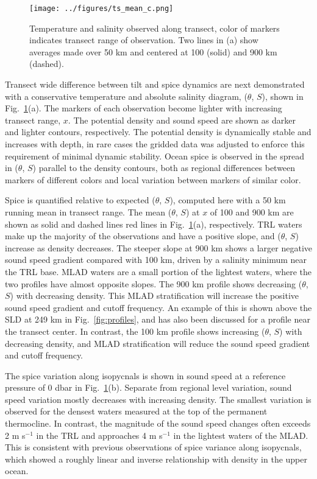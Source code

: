 \documentclass[preprint,NumberedRefs]{JASA}
\begin{document}
\begin{figure}
\texttt{[image: ../figures/ts\_mean\_c.png]}
    \caption{\label{fig:ts_diagram}{Temperature and salinity observed along transect, color of markers indicates transect range of observation. Two lines in (a) show averages made over 50 km and centered at 100 (solid) and 900 km (dashed).}}
\end{figure}
Transect wide difference between tilt and spice dynamics are next demonstrated with a conservative temperature and absolute salinity diagram\cite{TEOS10}, ($\theta$, $S$), shown in Fig.~\ref{fig:ts_diagram}(a). The markers of each observation become lighter with increasing transect range, $x$. The potential density and sound speed are shown as darker and lighter contours, respectively. The potential density is dynamically stable and increases with depth, in rare cases the gridded data was adjusted to enforce this requirement of minimal dynamic stability\citep{barker2017stabilizing}. Ocean spice is observed in the spread in ($\theta$, $S$) parallel to the density contours, both as regional differences between markers of different colors and local variation between markers of similar color.

Spice is quantified relative to expected ($\theta$, $S$), computed here with a 50 km running mean in transect range. The mean ($\theta$, $S$) at $x$ of 100 and 900 km are shown as solid and dashed lines red lines in Fig.~\ref{fig:ts_diagram}(a), respectively. TRL waters make up the majority of the observations and have a positive slope, and ($\theta$, $S$) increase as density decreases. The steeper slope at 900 km shows a larger negative sound speed gradient compared with 100 km, driven by a salinity minimum near the TRL base. MLAD waters are a small portion of the lightest waters, where the two profiles have almost opposite slopes. The 900 km profile shows decreasing ($\theta$, $S$) with decreasing density. This MLAD stratification will increase the positive sound speed gradient and cutoff frequency. An example of this is shown above the SLD at 249 km in Fig.~\ref{fig:profiles}, and has also been discussed for a profile near the transect center.\cite{colosi2020observations} In contrast, the 100 km profile shows increasing ($\theta$, $S$) with decreasing density, and MLAD stratification will reduce the sound speed gradient and cutoff frequency.

The spice variation along isopycnals is shown in sound speed at a reference pressure of 0 dbar in Fig.~\ref{fig:ts_diagram}(b). Separate from regional level variation, sound speed variation mostly decreases with increasing density. The smallest variation is observed for the densest waters measured at the top of the permanent thermocline\cite{cole2010seasonal}. In contrast, the magnitude of the sound speed changes often exceeds 2 m s$^{-1}$ in the TRL and approaches 4 m s$^{-1}$ in the lightest waters of the MLAD. This is consistent with previous observations of spice variance along isopycnals, which showed a roughly linear and inverse relationship with density in the upper ocean\cite{ferrari2000}.
\end{document}
